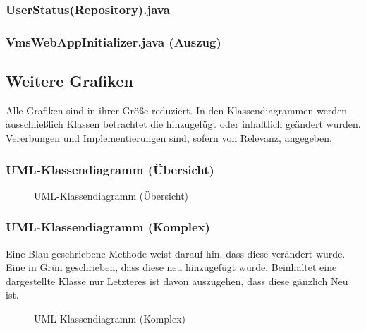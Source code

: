 \subsubsection{UserStatus(Repository).java}
\label{app:UserStatusRepository}



\clearpage
\subsubsection{VmsWebAppInitializer.java (Auszug)}
\label{app:VmsWebAppInitializer}



\clearpage
\subsection{Weitere Grafiken}
\label{app:Grafiken}
Alle Grafiken sind in ihrer Größe reduziert. In den Klassendiagrammen werden ausschließlich Klassen betrachtet die
hinzugefügt oder inhaltlich geändert wurden. Vererbungen und Implementierungen sind, sofern von Relevanz, angegeben.

\subsubsection{UML-Klassendiagramm (Übersicht)}
\label{app:UML-Klassendiagramm (Übersicht)}
\begin{figure}[htb]
\centering
{}
\caption{UML-Klassendiagramm (Übersicht)}
\end{figure}

\clearpage
\subsubsection{UML-Klassendiagramm (Komplex)}
\label{app:UML-Klassendiagramm (Komplex)}
Eine Blau-geschriebene Methode weist darauf hin, dass diese verändert wurde. Eine in Grün geschrieben, dass diese neu hinzugefügt
wurde. Beinhaltet eine dargestellte Klasse nur Letzteres ist davon auszugehen, dass diese gänzlich Neu ist.
\begin{figure}[htb]
\centering
{}
\caption{UML-Klassendiagramm (Komplex)}
\end{figure}





